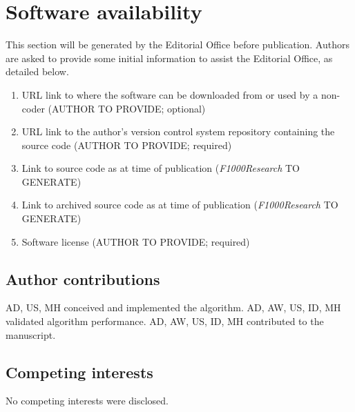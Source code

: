 

\section*{Software availability}
This section will be generated by the Editorial Office before publication. Authors are asked to provide some initial information to assist the Editorial Office, as detailed below.
\begin{enumerate}
\item URL link to where the software can be downloaded from or used by a non-coder (AUTHOR TO PROVIDE; optional)
\item URL link to the author's version control system repository containing the source code (AUTHOR TO PROVIDE; required)
\item Link to source code as at time of publication ({\textit{F1000Research}} TO GENERATE)
\item Link to archived source code as at time of publication ({\textit{F1000Research}} TO GENERATE)
\item Software license (AUTHOR TO PROVIDE; required)
\end{enumerate}


\subsection*{Author contributions}
AD, US, MH conceived and implemented the algorithm.
AD, AW, US, ID, MH validated algorithm performance.
AD, AW, US, ID, MH contributed to the manuscript.

\subsection*{Competing interests}
No competing interests were disclosed.

